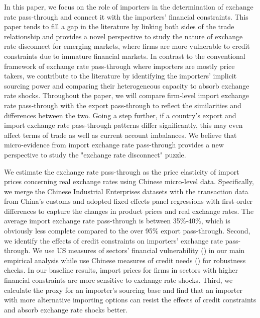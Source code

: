 In this paper, we focus on the role of importers in the determination of exchange rate pass-through and connect it with the importers' financial constraints. This paper tends to fill a gap in the literature by linking both sides of the trade relationship and provides a novel perspective to study the nature of exchange rate disconnect for emerging markets, where firms are more vulnerable to credit constraints due to immature financial markets. In contrast to the conventional framework of exchange rate pass-through where importers are mostly price takers, we contribute to the literature by identifying the importers' implicit sourcing power and comparing their heterogeneous capacity to absorb exchange rate shocks. Throughout the paper, we will compare firm-level import exchange rate pass-through with the export pass-through to reflect the similarities and differences between the two. Going a step further, if a country's export and import exchange rate pass-through patterns differ significantly, this may even affect terms of trade as well as current account imbalances. We believe that micro-evidence from import exchange rate pass-through provides a new perspective to study the "exchange rate disconnect" puzzle.

We estimate the exchange rate pass-through as the price elasticity of import prices concerning real exchange rates using Chinese micro-level data. Specifically, we merge the Chinese Industrial Enterprises datasets with the transaction data from China’s customs and adopted fixed effects panel regressions with first-order differences to capture the changes in product prices and real exchange rates. The average import exchange rate pass-through is between 35\%-40\%, which is obviously less complete compared to the over 95\% export pass-through. Second, we identify the effects of credit constraints on importers' exchange rate pass-through. We use US measures of sectors’ financial vulnerability (\cite{manova-wei-zhang2015}) in our main empirical analysis while use Chinese measures of credit needs (\cite{fan-li-yeaple2015}) for robustness checks. In our baseline results, import prices for firms in sectors with higher financial constraints are more sensitive to exchange rate shocks. Third, we calculate the proxy for an importer's sourcing base and find that an importer with more alternative importing options can resist the effects of credit constraints and absorb exchange rate shocks better.

